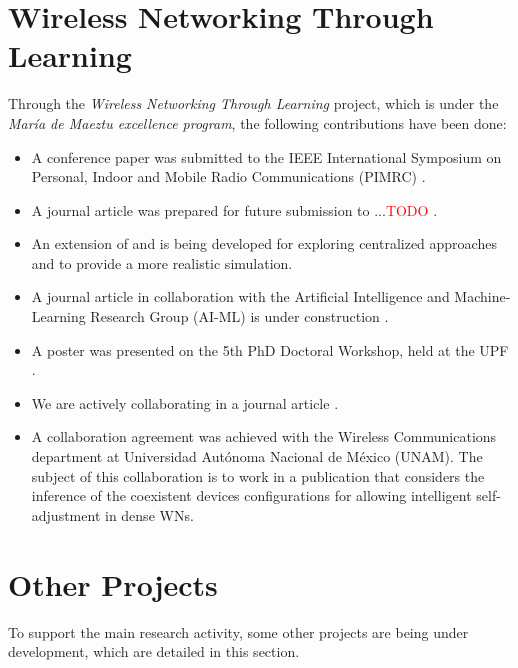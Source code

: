 \documentclass[12pt, a4paper,twoside]{tesi_upf}
\begin{document}
		\section{Wireless Networking Through Learning}
		\label{section:mdm}		
			Through the \textit{Wireless Networking Through Learning} project, which is under the \textit{Mar\'ia de Maeztu excellence program}, the following contributions have been done:
			\begin{itemize}
				\item A conference paper was submitted to the IEEE International Symposium on Personal, Indoor and Mobile Radio Communications (PIMRC) \cite{wilhelmi2017implications}.
				\item A journal article was prepared for future submission to ...\textcolor{red}{TODO} \cite{wilhelmi2017enhancing}.
				\item An extension of \cite{wilhelmi2017enhancing} and \cite{wilhelmi2017implications} is being developed for exploring centralized approaches and to provide a more realistic simulation.
				\item A journal article in collaboration with the Artificial Intelligence and Machine-Learning Research Group (AI-ML) is under construction \cite{bellalta2017learning}.
				\item A poster was presented on the 5th PhD Doctoral Workshop, held at the UPF \cite{wilhelmi2017improving}.
				\item We are actively collaborating in a journal article \cite{barrachina2017ctmn}.
				\item A collaboration agreement was achieved with the Wireless Communications department at Universidad Aut\'onoma Nacional de M\'exico (UNAM). The subject of this collaboration is to work in a publication that considers the inference of the coexistent devices configurations for allowing intelligent self-adjustment in dense WNs.
			\end{itemize}	
			
		\section{Other Projects}
		\label{section:other_projects}	
			To support the main research activity, some other projects are being under development, which are detailed in this section.
			
\end{document}
